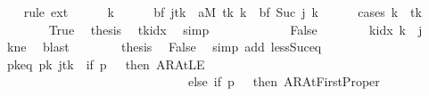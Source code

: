 \begin{isabellebody}
\ \ \isamarkupfalse%
\ {\isacharparenleft}{\kern0pt}rule\ ext{\isacharparenright}{\kern0pt}\isanewline
\ \ \ \ \isamarkupfalse%
\ k\isanewline
\ \ \ \ \isamarkupfalse%
\ {\isachardoublequoteopen}{\isacharparenleft}{\kern0pt}{\isacharparenleft}{\kern0pt}{\isacharquery}{\kern0pt}bf\ j{\isacharparenright}{\kern0pt}{\isacharparenleft}{\kern0pt}{\isacharquery}{\kern0pt}tk\ {\isacharcolon}{\kern0pt}{\isacharequal}{\kern0pt}\ {\isacharquery}{\kern0pt}aM\ {\isacharquery}{\kern0pt}tk{\isacharparenright}{\kern0pt}{\isacharparenright}{\kern0pt}\ k\ {\isacharequal}{\kern0pt}\ {\isacharquery}{\kern0pt}bf\ {\isacharparenleft}{\kern0pt}Suc\ j{\isacharparenright}{\kern0pt}\ k{\isachardoublequoteclose}\isanewline
\ \ \ \ \isamarkupfalse%
\ {\isacharparenleft}{\kern0pt}cases\ {\isachardoublequoteopen}k\ {\isacharequal}{\kern0pt}\ {\isacharquery}{\kern0pt}tk{\isachardoublequoteclose}{\isacharparenright}{\kern0pt}\isanewline
\ \ \ \ \ \ \isamarkupfalse%
\ True\ \isamarkupfalse%
\ {\isacharquery}{\kern0pt}thesis\ \isamarkupfalse%
\ tkidx\ \isamarkupfalse%
\ simp\isanewline
\ \ \ \ \isamarkupfalse%
\isanewline
\ \ \ \ \ \ \isamarkupfalse%
\ False\isanewline
\ \ \ \ \ \ \isamarkupfalse%
\ {\isachardoublequoteopen}k{\isacharunderscore}{\kern0pt}idx\ k\ {\isasymnoteq}\ j{\isachardoublequoteclose}\ \isamarkupfalse%
\ kne\ \isamarkupfalse%
\ blast\isanewline
\ \ \ \ \ \ \isamarkupfalse%
\ {\isacharquery}{\kern0pt}thesis\ \isamarkupfalse%
\ False\ \isamarkupfalse%
\ {\isacharparenleft}{\kern0pt}simp\ add{\isacharcolon}{\kern0pt}\ less{\isacharunderscore}{\kern0pt}Suc{\isacharunderscore}{\kern0pt}eq{\isacharparenright}{\kern0pt}\isanewline
\ \ \ \ \isamarkupfalse%
\isanewline
\ \ \isamarkupfalse%
\isanewline
\ \ \isamarkupfalse%
\ pk{\isacharunderscore}{\kern0pt}eq{\isacharcolon}{\kern0pt}\ {\isachardoublequoteopen}{\isacharparenleft}{\kern0pt}{\isacharquery}{\kern0pt}pk\ j{\isacharparenright}{\kern0pt}{\isacharparenleft}{\kern0pt}{\isacharquery}{\kern0pt}tk\ {\isacharcolon}{\kern0pt}{\isacharequal}{\kern0pt}\ if\ {\isacharquery}{\kern0pt}p\ {\isacharequal}{\kern0pt}\ {}\ then\ AR{\isacharunderscore}{\kern0pt}AtLE\isanewline
\ \ \ \ \ \ \ \ \ \ \ \ \ \ \ \ \ \ \ \ \ \ \ \ \ \ \ \ \ \ else\ if\ {\isacharquery}{\kern0pt}p\ {\isacharequal}{\kern0pt}\ {}\ then\ AR{\isacharunderscore}{\kern0pt}AtFirstProper\isanewline

\end{isabellebody}
